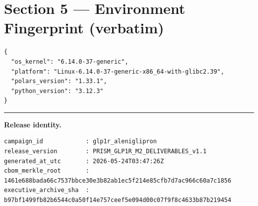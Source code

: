 \documentclass[11pt,a4paper]{article}
\begin{document}
\hypertarget{section-5--environment-fingerprint-verbatim}{%
\section{Section 5 --- Environment Fingerprint
(verbatim)}\label{section-5--environment-fingerprint-verbatim}}

\begin{lstlisting}
{
  "os_kernel": "6.14.0-37-generic",
  "platform": "Linux-6.14.0-37-generic-x86_64-with-glibc2.39",
  "polars_version": "1.33.1",
  "python_version": "3.12.3"
}
\end{lstlisting}


\vspace{8mm}
\hrule
\vspace{2mm}
\begin{flushleft}\small
\textbf{Release identity.}\\
\end{flushleft}
\begin{lstlisting}[caption={Release identity (verbatim)}]
campaign_id            : glp1r_aleniglipron
release_version        : PRISM_GLP1R_M2_DELIVERABLES_v1.1
generated_at_utc       : 2026-05-24T03:47:26Z
cbom_merkle_root       : 1461e688bada66c7537bbce30e3b82ab1ec5f214e85cfb7d7ac966c60a7c1856
executive_archive_sha  : b97bf1499fb82b6544c0a50f14e757ceef5e094d00c07f9f8c4633b87b219454
\end{lstlisting}
\end{document}
